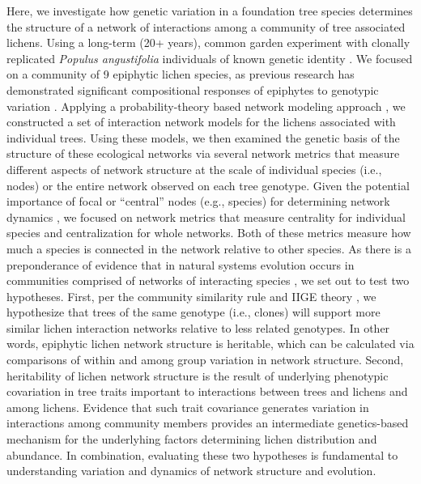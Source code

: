 \documentclass[fleqn,12pt]{olplainarticle}
\begin{document}
Here, we investigate how genetic variation in a foundation tree
species determines the structure of a network of interactions among a
community of tree associated lichens.  Using a long-term (20+ years),
common garden experiment with clonally replicated \textit{Populus
  angustifolia} individuals of known genetic identity
\citep{Martinsen2001HybridSpecies}. We focused on a community of 9
epiphytic lichen species, as previous research has demonstrated
significant compositional responses of epiphytes to genotypic
variation \citep{Winfree2011, Zytynska2011}. Applying a
probability-theory based network modeling approach \citep{Araujo2011},
we constructed a set of interaction network models for the lichens
associated with individual trees. Using these models, we then examined
the genetic basis of the structure of these ecological networks via
several network metrics that measure different aspects of network
structure at the scale of individual species (i.e., nodes) or the
entire network observed on each tree genotype. Given the potential
importance of focal or ``central'' nodes (e.g., species) for
determining network dynamics \citep{Lieberman2005EvolutionaryGraphs},
we focused on network metrics that measure centrality for individual
species and centralization for whole networks. Both of these metrics
measure how much a species is connected in the network relative to
other species. As there is a preponderance of evidence that in natural
systems evolution occurs in communities comprised of networks of
interacting species \citep{Lau2016afix, Keith2017, Thompson2013,
  Bascompte2006}, we set out to test two hypotheses. First, per the
community similarity rule \citep{Bangert2006} and IIGE theory
\citep{Whitham2020IntraspecificEvolution}, we hypothesize that trees
of the same genotype (i.e., clones) will support more similar lichen
interaction networks relative to less related genotypes. In other
words, epiphytic lichen network structure is heritable, which can be
calculated via comparisons of within and among group variation in
network structure. Second, heritability of lichen network structure is
the result of underlying phenotypic covariation in tree traits
important to interactions between trees and lichens and among
lichens. Evidence that such trait covariance generates variation in
interactions among community members provides an intermediate
genetics-based mechanism for the underlyhing factors determining
lichen distribution and abundance. In combination, evaluating these
two hypotheses is fundamental to understanding variation and dynamics
of network structure and evolution.
\end{document}
